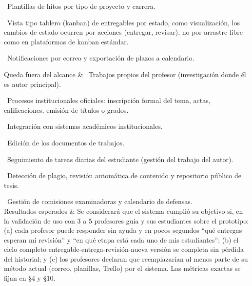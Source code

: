 \documentclass[10pt,a4paper]{article}
\newenvironment{kv}[1][4.6cm]
  {\footnotesize\setlength{\extrarowheight}{3pt}\xltabular{\linewidth}{|E{#1}|L|}\hline}
  {\endxltabular}
\newcommand{\kvrow}[2]{#1 & #2 \\ \hline}
\begin{document}
\begin{kv}
{\textbullet~Plantillas de hitos por tipo de proyecto y carrera.\par
\textbullet~Vista tipo tablero (kanban) de entregables por estado, como visualización, los cambios de estado ocurren por acciones (entregar, revisar), no por arrastre libre como en plataformas de kanban estándar.\par
\textbullet~Notificaciones por correo y exportación de plazos a calendario.}
\kvrow{Queda fuera del alcance}{%
\textbullet~Trabajos propios del profesor (investigación donde él es autor principal).\par
\textbullet~Procesos institucionales oficiales: inscripción formal del tema, actas, calificaciones, emisión de títulos o grados.\par
\textbullet~Integración con sistemas académicos institucionales.\par
\textbullet~Edición de los documentos de trabajos.\par
\textbullet~Seguimiento de tareas diarias del estudiante (gestión del trabajo del autor).\par
\textbullet~Detección de plagio, revisión automática de contenido y repositorio público de tesis.\par
\textbullet~Gestión de comisiones examinadoras y calendario de defensas.}
\kvrow{Resultados esperados}{Se considerará que el sistema cumplió su objetivo si, en la validación de uso con 3 a 5 profesores guía y sus estudiantes sobre el prototipo: (a) cada profesor puede responder sin ayuda y en pocos segundos ``qué entregas esperan mi revisión'' y ``en qué etapa está cada uno de mis estudiantes''; (b) el ciclo completo entregable-entrega-revisión-nueva versión se completa sin pérdida del historial; y (c) los profesores declaran que reemplazarían al menos parte de su método actual (correo, planillas, Trello) por el sistema. Las métricas exactas se fijan en §4 y §10.}
\end{kv}

\newpage
\end{document}

